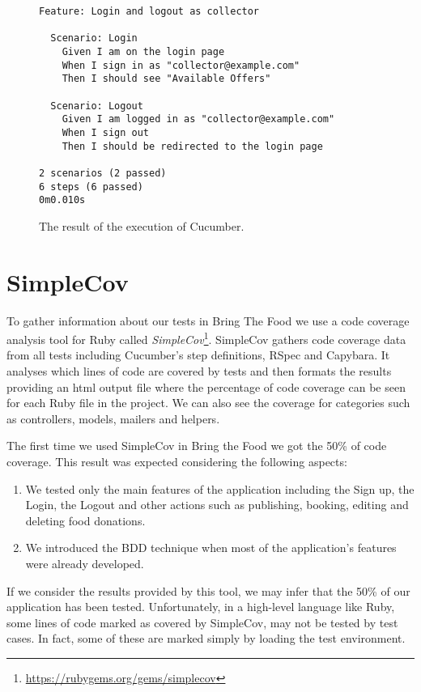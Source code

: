 \begin{figure}[h!]
\begin{verbatim}
Feature: Login and logout as collector

  Scenario: Login
    Given I am on the login page
    When I sign in as "collector@example.com"
    Then I should see "Available Offers"

  Scenario: Logout
    Given I am logged in as "collector@example.com"
    When I sign out
    Then I should be redirected to the login page

2 scenarios (2 passed)
6 steps (6 passed)
0m0.010s
\end{verbatim}
\vspace{-1em}
\caption{The result of the execution of Cucumber.}
\label{figure:scenario_example_original_executed}
\end{figure}

\newpage
\section{SimpleCov}

To gather information about our tests in Bring The Food we use a code coverage analysis tool for Ruby called \textit{SimpleCov}\footnote{\url{https://rubygems.org/gems/simplecov}}. SimpleCov gathers code coverage data from all tests including Cucumber's step definitions, RSpec and Capybara. It analyses which lines of code are covered by tests and then formats the results providing an html output file where the percentage of code coverage can be seen for each Ruby file in the project. We can also see the coverage for categories such as controllers, models, mailers and helpers.

The first time we used SimpleCov in Bring the Food we got the 50\% of code coverage. This result was expected considering the following aspects:

\begin{enumerate}
\item We tested only the main features of the application including the Sign up, the Login, the Logout and other actions such as publishing, booking, editing and deleting food donations.
\item We introduced the BDD technique when most of the application's features were already developed.
\end{enumerate}

If we consider the results provided by this tool, we may infer that the 50\% of our application has been tested.
Unfortunately, in a high-level language like Ruby, some lines of code marked as covered by SimpleCov, may not be tested by test cases. In fact, some of these are marked simply by loading the test environment.

